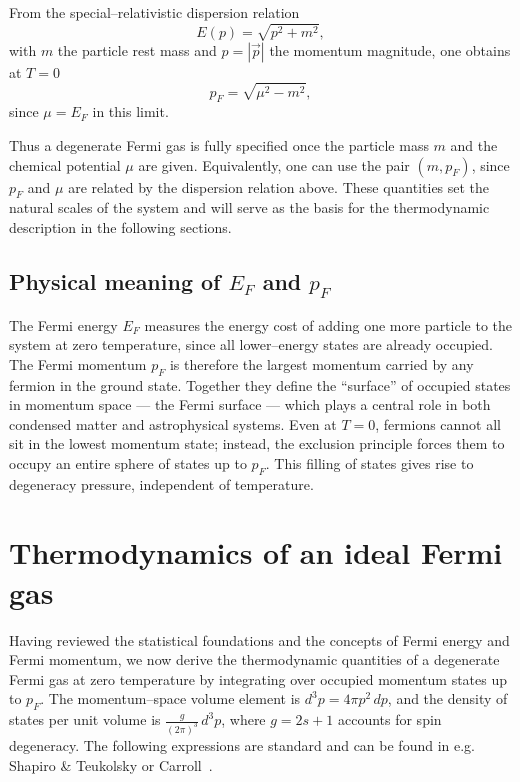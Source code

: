 From the special--relativistic dispersion relation
\begin{equation}
E(p) = \sqrt{p^2+m^2},
\label{eq:SR_dispersion}
\end{equation}
with $m$ the particle rest mass and $p=|\vec{p}|$ the momentum magnitude, one obtains at $T=0$ 
\begin{equation}
p_F = \sqrt{\mu^2 - m^2},
\end{equation}
since $\mu = E_F$ in this limit.  

Thus a degenerate Fermi gas is fully specified once the particle mass $m$ and the chemical potential $\mu$ are given.
Equivalently, one can use the pair $(m, p_F)$, since $p_F$ and $\mu$ are related by the dispersion relation above.
These quantities set the natural scales of the system and will serve as the basis for the thermodynamic description in the following sections.

\subsection*{Physical meaning of $E_F$ and $p_F$}
The Fermi energy $E_F$ measures the energy cost of adding one more particle to the system at zero
temperature, since all lower--energy states are already occupied. The Fermi momentum $p_F$ is
therefore the largest momentum carried by any fermion in the ground state. Together they define
the ``surface'' of occupied states in momentum space --- the Fermi surface --- which plays a central
role in both condensed matter and astrophysical systems. Even at $T=0$, fermions cannot all sit in
the lowest momentum state; instead, the exclusion principle forces them to occupy an entire sphere
of states up to $p_F$. This filling of states gives rise to degeneracy pressure, independent of
temperature.


\section{Thermodynamics of an ideal Fermi gas}
\label{sec:thermo_ideal_fermi}

Having reviewed the statistical foundations and the concepts of Fermi energy and Fermi
momentum, we now derive the thermodynamic quantities of a degenerate Fermi gas at zero
temperature by integrating over occupied momentum states up to $p_F$. The momentum--space
volume element is $d^3p=4\pi p^2\,dp$, and the density of states per unit volume is
$\tfrac{g}{(2\pi)^3}\,d^3p$, where $g=2s+1$ accounts for spin degeneracy. The following expressions are
standard and can be found in e.g. Shapiro \& Teukolsky or Carroll~\cite{shapiro_teukolsky,carroll}.

